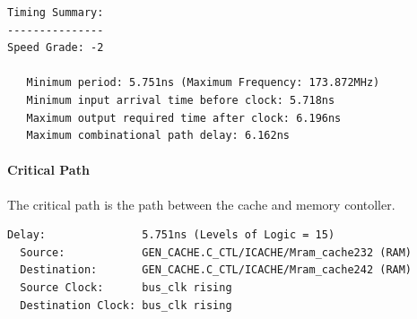 \documentclass[11pt,letterpaper,]{article}
\begin{document}
\begin{verbatim}
Timing Summary:
---------------
Speed Grade: -2

   Minimum period: 5.751ns (Maximum Frequency: 173.872MHz)
   Minimum input arrival time before clock: 5.718ns
   Maximum output required time after clock: 6.196ns
   Maximum combinational path delay: 6.162ns
\end{verbatim}

\paragraph{ Critical Path }
The critical path is the path between the cache and memory contoller.

\begin{tiny}
\begin{verbatim}
Delay:               5.751ns (Levels of Logic = 15)
  Source:            GEN_CACHE.C_CTL/ICACHE/Mram_cache232 (RAM)
  Destination:       GEN_CACHE.C_CTL/ICACHE/Mram_cache242 (RAM)
  Source Clock:      bus_clk rising
  Destination Clock: bus_clk rising


\end{verbatim}
\end{tiny}
\end{document}
